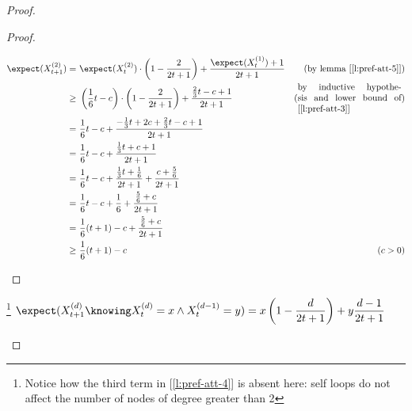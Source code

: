 \begin{proof}
\begin{proof}
\begin{itemize}
                \begin{align*}
                    \expect(X_{t + 1}^{(2)}) =&\ \expect(X_t^{(2)}) \cdot \left( 1 - \frac{2}{2t + 1} \right) + \frac{\expect(X_t^{(1)}) + 1}{2t + 1} & \text{(by lemma [\ref{l:pref-att-5}])} \\
                    \geq&\ \left( \frac{1}{6} t - c \right) \cdot \left( 1 - \frac{2}{2t + 1} \right) + \frac{\frac{2}{3}t - c + 1}{2t + 1} &
                    \text{(\parbox{\textwidth/3}{by inductive hypothesis and lower bound of [\ref{l:pref-att-3}]})} \\
                       =&\ \frac{1}{6} t - c + \frac{-\frac{1}{3} t + 2c + \frac{2}{3} t - c + 1}{2t + 1}                                   &           \\
                       =&\ \frac{1}{6} t - c + \frac{ \frac{1}{3} t + c + 1}{2t + 1}                                                        &           \\
                       =&\ \frac{1}{6} t - c + \frac{ \frac{1}{3} t + \frac{1}{6}}{2t + 1} + \frac{c + \frac{5}{6}}{2t + 1}                 &           \\
                       =&\ \frac{1}{6} t - c + \frac{1}{6} + \frac{ \frac{5}{6} + c}{2t + 1}                                                &           \\
                       =&\ \frac{1}{6} (t + 1) - c + \frac{ \frac{5}{6} + c}{2t + 1}                                                        &           \\
                    \geq&\ \frac{1}{6} (t + 1) - c                                                                                          & (c > 0)   \\
                \end{align*}
        \end{itemize}
        
    \end{proof}

    \vbox{}
    

    \vbox{}

    \begin{lem}\label{l:pref-att-7}\footnote{Notice how the third term in [\ref{l:pref-att-4}] is absent here: self loops do not affect the number of nodes of degree greater than 2}
        $\displaystyle \expect(X_{t + 1}^{(d)} \knowing X_t^{(d)} = x \wedge X_t^{(d - 1)} = y) = x \left( 1 - \frac{d}{2t + 1} \right) + y \frac{d - 1}{2t + 1}$
    \end{lem}


\end{proof}
